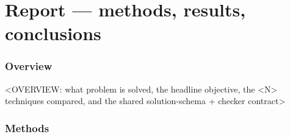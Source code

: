%
%
%

\part{Report --- methods, results, conclusions}

\section{Overview}
<OVERVIEW: what problem is solved, the headline objective, the <N> techniques
compared, and the shared solution-schema + checker contract>

\section{Methods}

